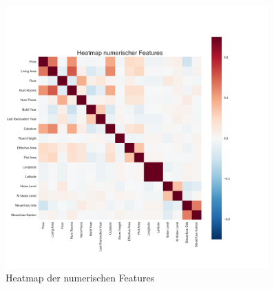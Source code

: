 \begin{figure}[h!]
\centering
\includegraphics[width=0.9\textwidth]{images/Heatmap_numerical.png}
\caption[Heatmap der numerischen Features]{Heatmap der numerischen Features}
\label{fig:heatmap}
\end{figure}

